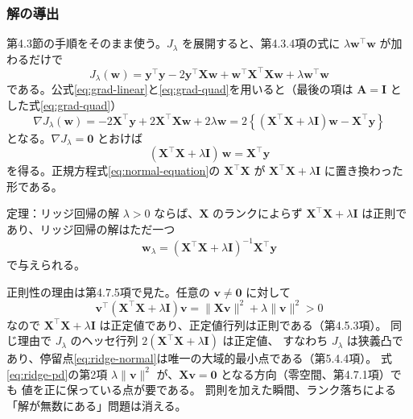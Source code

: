\subsubsection{解の導出}

第4.3節の手順をそのまま使う。$J_\lambda$ を展開すると、第4.3.4項の式に $\lambda\bm{w}^\top\bm{w}$ が加わるだけで
\begin{equation}
  J_\lambda(\bm{w}) = \bm{y}^\top\bm{y} - 2\bm{y}^\top\bm{X}\bm{w} + \bm{w}^\top\bm{X}^\top\bm{X}\bm{w} + \lambda\bm{w}^\top\bm{w}
\end{equation}
である。公式\eqref{eq:grad-linear}と\eqref{eq:grad-quad}を用いると（最後の項は $\bm{A} = \bm{I}$ とした式\eqref{eq:grad-quad}）
\begin{equation}
  \nabla J_\lambda(\bm{w}) = -2\bm{X}^\top\bm{y} + 2\bm{X}^\top\bm{X}\bm{w} + 2\lambda\bm{w}
  = 2\left\{ (\bm{X}^\top\bm{X} + \lambda\bm{I})\bm{w} - \bm{X}^\top\bm{y} \right\}
  \label{eq:ridge-grad}
\end{equation}
となる。$\nabla J_\lambda = \bm{0}$ とおけば
\begin{equation}
  (\bm{X}^\top\bm{X} + \lambda\bm{I})\,\bm{w} = \bm{X}^\top\bm{y}
  \label{eq:ridge-normal}
\end{equation}
を得る。正規方程式\eqref{eq:normal-equation}の $\bm{X}^\top\bm{X}$ が $\bm{X}^\top\bm{X} + \lambda\bm{I}$ に置き換わった形である。

\begin{itembox}[l]{定理：リッジ回帰の解}
$\lambda > 0$ ならば、$\bm{X}$ のランクによらず $\bm{X}^\top\bm{X} + \lambda\bm{I}$ は正則であり、リッジ回帰の解はただ一つ
\begin{equation}
  \bm{w}_\lambda = (\bm{X}^\top\bm{X} + \lambda\bm{I})^{-1}\bm{X}^\top\bm{y}
  \label{eq:ridge-sol}
\end{equation}
で与えられる。
\end{itembox}

正則性の理由は第4.7.5項で見た。任意の $\bm{v} \neq \bm{0}$ に対して
\begin{equation}
  \bm{v}^\top(\bm{X}^\top\bm{X} + \lambda\bm{I})\bm{v} = \|\bm{X}\bm{v}\|^2 + \lambda\|\bm{v}\|^2 > 0
  \label{eq:ridge-pd}
\end{equation}
なので $\bm{X}^\top\bm{X} + \lambda\bm{I}$ は正定値であり、正定値行列は正則である（第4.5.3項）。
同じ理由で $J_\lambda$ のヘッセ行列 $2(\bm{X}^\top\bm{X} + \lambda\bm{I})$ は正定値、
すなわち $J_\lambda$ は狭義凸であり、停留点\eqref{eq:ridge-normal}は唯一の大域的最小点である（第5.4.4項）。
式\eqref{eq:ridge-pd}の第2項 $\lambda\|\bm{v}\|^2$ が、$\bm{X}\bm{v} = \bm{0}$ となる方向（零空間、第4.7.1項）でも
値を正に保っている点が要である。
罰則を加えた瞬間、ランク落ちによる「解が無数にある」問題は消える。

